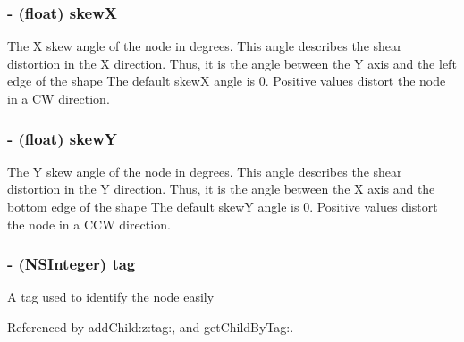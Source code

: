 \hypertarget{class_c_c_node_a3ab54b6652338e7d575ee14971147cbf}{
\subsubsection[{skew\-X}]{\setlength{\rightskip}{0pt plus 5cm}-\/ (float) {\bf skew\-X}}}\label{class_c_c_node_a3ab54b6652338e7d575ee14971147cbf}
The X skew angle of the node in degrees. This angle describes the shear distortion in the X direction. Thus, it is the angle between the Y axis and the left edge of the shape The default skew\-X angle is 0. Positive values distort the node in a C\-W direction. \hypertarget{class_c_c_node_a0adeb25bc880ed50012bdc8c8a811718}{
\subsubsection[{skew\-Y}]{\setlength{\rightskip}{0pt plus 5cm}-\/ (float) {\bf skew\-Y}}}\label{class_c_c_node_a0adeb25bc880ed50012bdc8c8a811718}
The Y skew angle of the node in degrees. This angle describes the shear distortion in the Y direction. Thus, it is the angle between the X axis and the bottom edge of the shape The default skew\-Y angle is 0. Positive values distort the node in a C\-C\-W direction. \hypertarget{class_c_c_node_a4ed1d0596afb7822a87e41b75b496af3}{
\subsubsection[{tag}]{\setlength{\rightskip}{0pt plus 5cm}-\/ (N\-S\-Integer) {\bf tag}}}\label{class_c_c_node_a4ed1d0596afb7822a87e41b75b496af3}
A tag used to identify the node easily 

Referenced by add\-Child\-:z\-:tag\-:, and get\-Child\-By\-Tag\-:.


